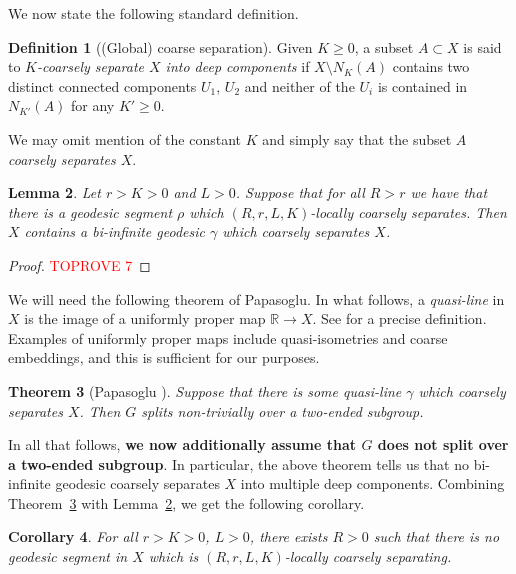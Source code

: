 \documentclass[10pt,a4paper]{amsart}
\newcommand{\R}{\mathbb{R}}
\newtheorem{theorem}{Theorem}[section]
\newtheorem{lemma}[theorem]{Lemma}
\newtheorem{corollary}[theorem]{Corollary}
\theoremstyle{definition}
\newtheorem{definition}[theorem]{Definition}
\begin{document}
We now state the following standard definition.

\begin{definition}[(Global) coarse separation]
    Given $K \geq 0$, a subset $A \subset X$ is said to \textit{$K$-coarsely separate $X$ into deep components} if $X \setminus N_K(A)$ contains two distinct connected components $U_1$, $U_2$ and neither of the $U_i$ is contained in $N_{K'}(A)$ for any $K' \geq 0$. 

    
\end{definition}

We may omit mention of the constant $K$ and simply say that the subset \textit{$A$ coarsely separates $X$}.


\begin{lemma}\label{lem:coarsely-sep-geodesic}
    Let $r > K > 0$ and $L > 0$. Suppose that for all $R > r$ we have that there is a geodesic segment $\rho$ which $(R,r, L, K)$-locally coarsely separates. 
    Then $X$ contains a bi-infinite geodesic $\gamma$ which coarsely separates $X$. 
\end{lemma}


\begin{proof}\textcolor{red}{TOPROVE 7}\end{proof}



We will need the following theorem of Papasoglu. In what follows, a \textit{quasi-line} in $X$ is the image of a uniformly proper map $\R \to X$. See \cite{papasoglu2005quasi} for a precise definition. Examples of uniformly proper maps include quasi-isometries and coarse embeddings, and this is sufficient for our purposes. 

\begin{theorem}[Papasoglu \cite{papasoglu2005quasi}]\label{thm:papasoglu}
    Suppose that there is some quasi-line $\gamma$ which coarsely separates $X$.  Then $G$ splits non-trivially over a two-ended subgroup. 
\end{theorem}

In all that follows, \textbf{we now additionally assume that $G$ does not split over a two-ended subgroup}. 
In particular, the above theorem tells us that no bi-infinite geodesic coarsely separates $X$ into multiple deep components. 
Combining Theorem~\ref{thm:papasoglu} with Lemma~\ref{lem:coarsely-sep-geodesic}, we get the following corollary. 

\begin{corollary}
    For all $r > K > 0$, $L > 0$, there exists $R > 0$ such that there is no geodesic segment in $X$ which is $(R, r, L , K)$-locally coarsely separating. 
\end{corollary}
\end{document}
